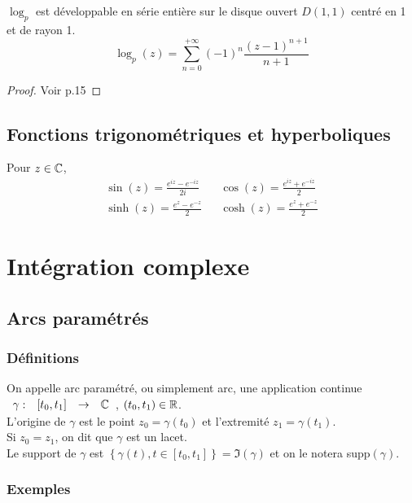 \documentclass[]{report}
\begin{document}
\begin{lm}
    $\log_p$ est développable en série entière sur le disque ouvert $D(1,1)$ centré en 1 et de rayon 1.$$\log_p(z)=\sum_{n=0}^{+\infty}(-1)^n\frac{(z-1)^{n+1}}{n+1}$$
\end{lm}

\begin{proof}
    Voir p.15
\end{proof}

\section{Fonctions trigonométriques et hyperboliques}

Pour $z\in\mathbb{C}$, \begin{align*}
    \sin(z)=\frac{e^{iz}-e^{-iz}}{2i} && \cos(z)=\frac{e^{iz}+e^{-iz}}{2}\\
    \sinh(z)=\frac{e^{z}-e^{-z}}{2} && \cosh(z)=\frac{e^{z}+e^{-z}}{2}
\end{align*}

\chapter{Intégration complexe}

\section{Arcs paramétrés}

\subsection{Définitions}

On appelle arc paramétré, ou simplement arc, une application continue $\begin{array}{ccccc}
\gamma : & [t_0,t_1] & \to & \mathbb{C} \\ 
\end{array}$, $(t_0,t_1)\in\mathbb{R}$.\\
L'origine de $\gamma$ est le point $z_0=\gamma(t_0)$ et l'extremité $z_1=\gamma(t_1)$.\\
Si $z_0=z_1$, on dit que $\gamma$ est un lacet.\\
Le support de $\gamma$ est $\left\{\gamma(t),t\in[t_0,t_1]\right\}=\Im(\gamma)$ et on le notera supp$(\gamma)$.

\subsection{Exemples}
\end{document}
